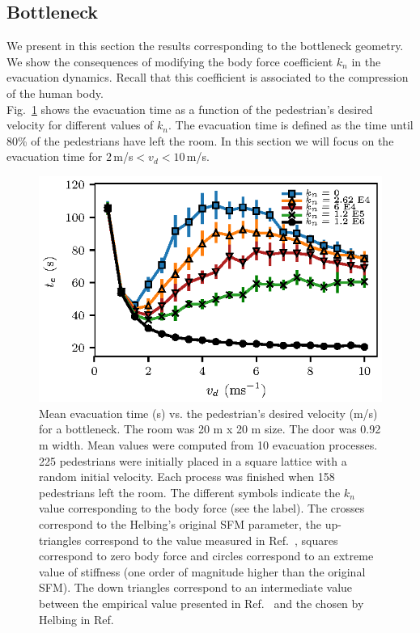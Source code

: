\documentclass[preprint,12pt]{elsarticle}
\begin{document}
\subsection{\label{bottleneck} Bottleneck}


We present in this section the results corresponding to the bottleneck geometry. 
We show the consequences of modifying the body force coefficient $k_n$ in the 
evacuation dynamics. Recall that this coefficient is associated 
to the compression of the human body. \\

Fig.~\ref{vd_vs_te} shows the evacuation time as a function of the pedestrian's 
desired velocity for different values of $k_n$. The evacuation 
time is defined as the time until 80\% of the pedestrians have 
left the room. In this section we will focus on the evacuation time for 
$2\,$m/s$<v_d<10\,$m/s.\\


\begin{figure}[htbp!]
\centering
\includegraphics[width=0.7\columnwidth]
{./vd_vs_te_N225.eps}
\caption{\label{vd_vs_te}Mean evacuation time (s) vs. the pedestrian’s desired  
velocity (m/s) for a bottleneck. The room was 20 m x 20 m size. The door was 
0.92 m width. Mean values were computed from 10 evacuation processes. 225 
pedestrians were initially placed in a square lattice with a random initial 
velocity. Each process was finished when 158 pedestrians left the room. The 
different symbols indicate the $k_n$ value corresponding to the body force (see 
the label). The crosses correspond to the Helbing's original SFM parameter, the 
up-triangles correspond to the value measured in 
Ref.~\cite{melvin1988aatd}, squares correspond 
to zero body force and circles correspond to an extreme value of stiffness (one 
order of magnitude higher than the original SFM). The 
 down triangles correspond to an intermediate value between the empirical value 
presented in Ref.~\cite{melvin1988aatd} and the chosen by Helbing in 
Ref.~\cite{helbing_2000} }
\end{figure}
\end{document}
